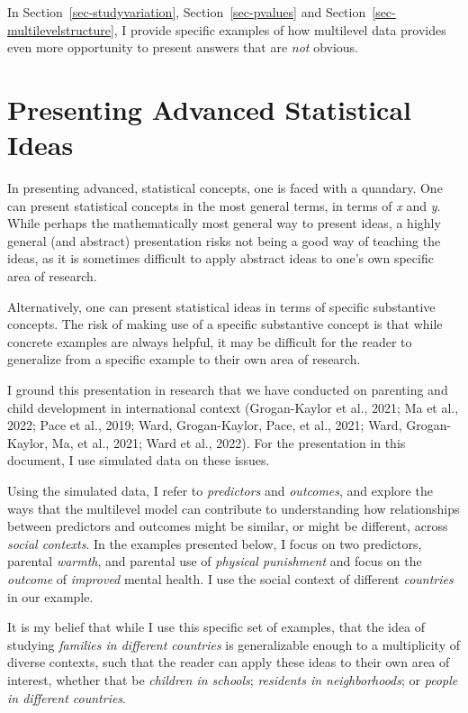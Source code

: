 \documentclass[
  letterpaper,
  DIV=11,
  numbers=noendperiod]{scrreprt}
\begin{document}
In Section~\ref{sec-studyvariation}, Section~\ref{sec-pvalues} and
Section~\ref{sec-multilevelstructure}, I provide specific examples of
how multilevel data provides even more opportunity to present answers
that are \emph{not} obvious.

\section{Presenting Advanced Statistical
Ideas}\label{presenting-advanced-statistical-ideas}

In presenting advanced, statistical concepts, one is faced with a
quandary. One can present statistical concepts in the most general
terms, in terms of \emph{x} and \emph{y}. While perhaps the
mathematically most general way to present ideas, a highly general (and
abstract) presentation risks not being a good way of teaching the ideas,
as it is sometimes difficult to apply abstract ideas to one's own
specific area of research.

Alternatively, one can present statistical ideas in terms of specific
substantive concepts. The risk of making use of a specific substantive
concept is that while concrete examples are always helpful, it may be
difficult for the reader to generalize from a specific example to their
own area of research.

I ground this presentation in research that we have conducted on
parenting and child development in international context (Grogan-Kaylor
et al., 2021; Ma et al., 2022; Pace et al., 2019; Ward, Grogan-Kaylor,
Pace, et al., 2021; Ward, Grogan-Kaylor, Ma, et al., 2021; Ward et al.,
2022). For the presentation in this document, I use simulated data on
these issues.

Using the simulated data, I refer to \emph{predictors} and
\emph{outcomes}, and explore the ways that the multilevel model can
contribute to understanding how relationships between predictors and
outcomes might be similar, or might be different, across \emph{social
contexts}. In the examples presented below, I focus on two predictors,
parental \emph{warmth}, and parental use of \emph{physical punishment}
and focus on the \emph{outcome} of \emph{improved} mental health. I use
the social context of different \emph{countries} in our example.

It is my belief that while I use this specific set of examples, that the
idea of studying \emph{families in different countries} is generalizable
enough to a multiplicity of diverse contexts, such that the reader can
apply these ideas to their own area of interest, whether that be
\emph{children in schools}; \emph{residents in neighborhoods}; or
\emph{people in different countries}.
\end{document}
